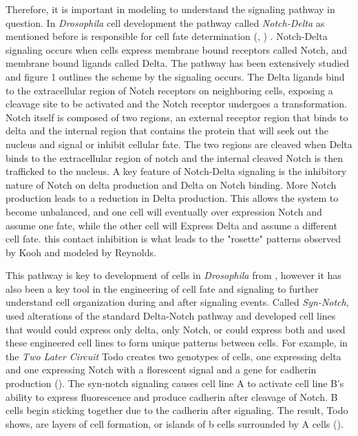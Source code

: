 \documentclass[12pt]{ifacconf}
\begin{document}
Therefore, it is important in modeling to understand the signaling pathway in question. In \emph{Drosophila} cell development the pathway called \emph{Notch-Delta} as mentioned before is responsible for cell fate determination (\cite{LN:04}, \cite{ATN:95}) . Notch-Delta signaling occurs when cells express membrane bound receptors called Notch, and membrane bound ligands called Delta. The pathway has been extensively studied and figure 1 outlines the scheme by the signaling occurs. The Delta ligands bind to the extracellular region of Notch receptors on neighboring cells, exposing a cleavage site to be activated and the Notch receptor undergoes a transformation. Notch itself is composed of two regions, an external receptor region that binds to delta and the internal region that contains the protein that will seek out the nucleus and signal or inhibit cellular fate. The two regions are cleaved when Delta binds to the extracellular region of notch and the internal cleaved Notch is then trafficked to the nucleus. A key feature of Notch-Delta signaling is the inhibitory nature of Notch on delta production and Delta on Notch binding. More Notch production leads to a reduction in Delta production. This allows the system to become unbalanced, and one cell will eventually over expression Notch and assume one fate, while the other cell will Express Delta and assume a different cell fate. this contact inhibition is what leads to the "rosette" patterns observed by Kooh and modeled by Reynolds. 

This pathway is key to development of cells in \emph{Drosophila} from \cite{KI:93}, however it has also been a key tool in the engineering of cell fate and signaling to further understand cell organization during and after signaling events. Called \emph{Syn-Notch}, \cite{TP:18} used alterations of the standard Delta-Notch pathway and developed cell lines that would could express only delta, only Notch, or could express both and used these engineered cell lines to form unique patterns between cells. For example, in the \emph{ Two Later Circuit} Todo creates two genotypes of cells, one expressing delta and one expressing Notch with a florescent signal and a gene for cadherin production (\cite{TP:18}). The syn-notch signaling causes cell line A to activate cell line B's ability to express fluorescence and produce cadherin after cleavage of Notch. B cells begin sticking together due to the cadherin after signaling. The result, Todo shows, are layers of cell formation, or islands of b cells surrounded by A cells (\cite{TP:18}). 
\end{document}
